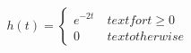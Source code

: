 \documentclass[preview]{standalone}
\begin{document}
\begin{align*}
h ( t )   =   \begin{cases}   e^{-2 t }   &   \ t ex t {for   }   t   \geq   0   \\   0   &   \ t ex t {o t h erwise}   \end{cases}
\end{align*}
\end{document}
